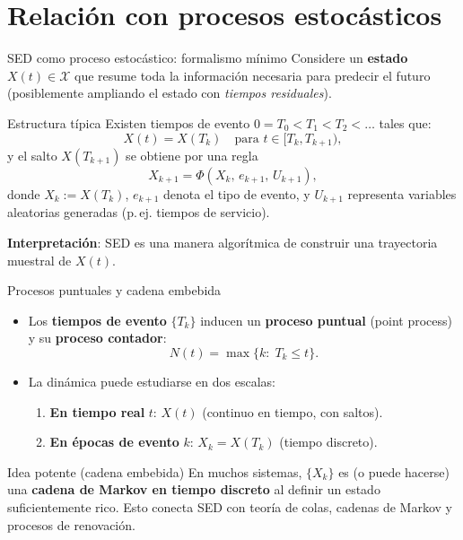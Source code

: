 \documentclass[aspectratio=1610, 9pt]{beamer}
\begin{document}
\section{Relación con procesos estocásticos}

\begin{frame}{SED como proceso estocástico: formalismo mínimo}
\small
Considere un \textbf{estado} $X(t)\in\mathcal{X}$ que resume toda la información necesaria para predecir el futuro (posiblemente ampliando el estado con \emph{tiempos residuales}).

\begin{block}{Estructura típica}
Existen tiempos de evento $0=T_0<T_1<T_2<\dots$ tales que:
\[
X(t)=X(T_k)\quad \text{para } t\in[T_k,T_{k+1}),
\]
y el salto $X(T_{k+1})$ se obtiene por una regla
\[
X_{k+1}=\Phi(X_k,\,e_{k+1},\,U_{k+1}),
\]
donde $X_k:=X(T_k)$, $e_{k+1}$ denota el tipo de evento, y $U_{k+1}$ representa variables aleatorias generadas (p.\,ej. tiempos de servicio).
\end{block}

\vspace{2pt}
\textbf{Interpretación}: SED es una manera algorítmica de construir una trayectoria muestral de $X(t)$.
\end{frame}

\begin{frame}{Procesos puntuales y cadena embebida}
\small
\begin{itemize}
\item Los \textbf{tiempos de evento} $\{T_k\}$ inducen un \textbf{proceso puntual} (point process) y su \textbf{proceso contador}:
\[
N(t)=\max\{k:\;T_k\le t\}.
\]
\item La dinámica puede estudiarse en dos escalas:
\begin{enumerate}
\item \textbf{En tiempo real} $t$: $X(t)$ (continuo en tiempo, con saltos).
\item \textbf{En épocas de evento} $k$: $X_k=X(T_k)$ (tiempo discreto).
\end{enumerate}
\end{itemize}

\vspace{6pt}
\begin{block}{Idea potente (cadena embebida)}
En muchos sistemas, $\{X_k\}$ es (o puede hacerse) una \textbf{cadena de Markov en tiempo discreto} al definir un estado suficientemente rico. Esto conecta SED con teoría de colas, cadenas de Markov y procesos de renovación.
\end{block}
\end{frame}
\end{document}
